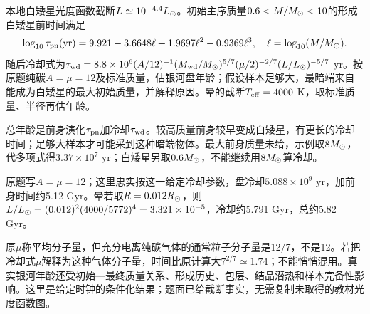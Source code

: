 \begin{exercise}
本地白矮星光度函数截断$L\simeq10^{-4.4}L_{\odot}$。初始主序质量$0.6<M/M_{\odot}<10$的形成白矮星前时间满足
\[
 \log_{10}\tau_{\rm pn}(\mathrm{yr})=9.921-3.6648\ell+1.9697\ell^2-0.9369\ell^3,
 \quad\ell=\log_{10}(M/M_{\odot}).
\]
随后冷却式为$\tau_{\rm wd}=8.8\times10^6(A/12)^{-1}(M_{\rm wd}/M_{\odot})^{5/7}(\mu/2)^{-2/7}(L/L_{\odot})^{-5/7}$ yr。按原题纯碳$A=\mu=12$及标准质量，估银河盘年龄；假设样本足够大，最暗端来自能成为白矮星的最大初始质量，并解释原因。晕的截断$T_{\rm eff}=4000$ K，取标准质量、半径再估年龄。
\end{exercise}
\begin{solution}
总年龄是前身演化$\tau_{\rm pn}$加冷却$\tau_{\rm wd}$。较高质量前身较早变成白矮星，有更长的冷却时间；足够大样本才可能采到这种暗端物体。最大前身质量未给，示例取$8M_{\odot}$，代多项式得$3.37\times10^7$ yr；白矮星另取$0.6M_{\odot}$，不能继续用$8M_{\odot}$算冷却。

原题写$A=\mu=12$；这里忠实按这一给定冷却参数，盘冷却$5.088\times10^9$ yr，加前身时间约5.12 Gyr。晕若取$R=0.012R_{\odot}$，则$L/L_{\odot}=(0.012)^2(4000/5772)^4=3.321\times10^{-5}$，冷却约5.791 Gyr，总约5.82 Gyr。

原$\mu$称平均分子量，但充分电离纯碳气体的通常粒子分子量是12/7，不是12。若把冷却式$\mu$解释为这种气体分子量，时间比原计算大$7^{2/7}\simeq1.74$；不能悄悄混用。真实银河年龄还受初始—最终质量关系、形成历史、包层、结晶潜热和样本完备性影响。这里是给定时钟的条件化结果；题面已给截断事实，无需复制未取得的教材光度函数图。
\end{solution}

